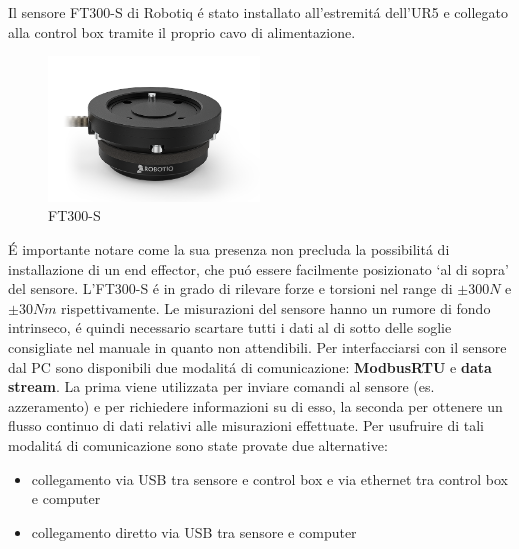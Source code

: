 Il sensore FT300-S di Robotiq \'{e} stato installato all'estremit\'{a} dell'UR5 e collegato alla control box tramite il proprio 
cavo di alimentazione. 
\begin{figure}[H]
    \centering
    \includegraphics*[width=0.5\textwidth]{images/ft.png}
    \caption{FT300-S}
    \label{fig:ft}
\end{figure}
\'{E} importante notare come la sua presenza non precluda la possibilit\'{a} di installazione di un end effector, 
che pu\'{o} essere facilmente posizionato `al di sopra' del sensore. 
L'FT300-S \'{e} in grado di rilevare forze e torsioni nel range di $\pm 300 N$ e $\pm 30 Nm$ rispettivamente. 
Le misurazioni del sensore hanno un rumore di fondo intrinseco, \'{e} quindi necessario scartare tutti i dati al di sotto delle 
soglie consigliate nel manuale \cite{ft_sensor} in quanto non attendibili. 
Per interfacciarsi con il sensore dal PC sono disponibili due modalit\'{a} di comunicazione: \textbf{ModbusRTU} e \textbf{data stream}. 
La prima viene utilizzata per inviare comandi al sensore (es. azzeramento) e per richiedere informazioni su di esso, la seconda 
per ottenere un flusso continuo di dati relativi alle misurazioni effettuate. 
Per usufruire di tali modalit\'{a} di comunicazione sono state provate due alternative: 
\begin{itemize}
    \item collegamento via USB tra sensore e control box e via ethernet tra control box e computer
    \item collegamento diretto via USB tra sensore e computer
\end{itemize}

